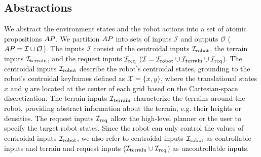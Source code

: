 \documentclass[letterpaper, 10 pt, conference]{ieeeconf}
\begin{document}
\subsection{Abstractions}\label{sec:preliminaries_abstraction}
We abstract the environment states and the robot actions into a set of atomic propositions $AP$.
We partition $AP$
into sets of inputs $\mathcal{I}$
and outputs $\mathcal{O}$
($AP = {\mathcal I} \cup {\mathcal O}$).
The inputs $\mathcal{I}$ consist of
the centroidal inputs ${\mathcal I}_{\textrm{robot}}$,
the terrain inputs ${\mathcal I}_{\textrm{terrain}}$,
and the request inputs ${\mathcal I}_{\textrm{req}}$
(${\mathcal I} = {\mathcal I}_{\textrm{robot}} \cup {\mathcal I}_{\textrm{terrain}} \cup {\mathcal I}_{\textrm{req}}$).
The centroidal inputs ${\mathcal I}_{\textrm{robot}}$ describe the robot's centroidal states,
grounding to the robot's centroidal keyframes
defined as $\mathcal{X} = \{x, y\}$, where the translational states $x$ and $y$ are located at the center of each grid based on the Cartesian-space discretization. 
%
The terrain inputs ${\mathcal I}_{\textrm{terrain}}$
characterize the terrains around the robot,
providing abstract information about the terrain,
e.g. their heights
or densities.
%
The request inputs ${\mathcal I}_{\textrm{req}}$ allow the high-level planner or the user to specify the target robot states.
%
Since the robot can only control the values of centroidal inputs ${\mathcal I}_{\textrm{robot}}$, 
we also refer to centroidal inputs ${\mathcal I}_{\textrm{robot}}$ as controllable inputs
and
terrain and request inputs (${\mathcal I}_{\textrm{terrain}}\cup {\mathcal I}_{\textrm{req}}$) as uncontrollable inputs.
\end{document}
